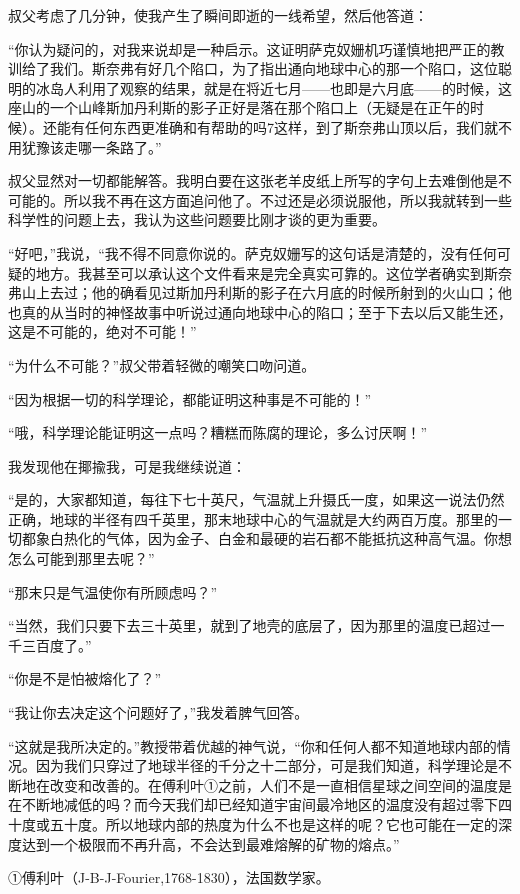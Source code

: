 \documentclass[10pt]{book}
\begin{document}
叔父考虑了几分钟，使我产生了瞬间即逝的一线希望，然后他答道：

“你认为疑问的，对我来说却是一种启示。这证明萨克奴姗机巧谨慎地把严正的教训给了我们。斯奈弗有好几个陷口，为了指出通向地球中心的那一个陷口，这位聪明的冰岛人利用了观察的结果，就是在将近七月——也即是六月底——的时候，这座山的一个山峰斯加丹利斯的影子正好是落在那个陷口上（无疑是在正午的时候）。还能有任何东西更准确和有帮助的吗7这样，到了斯奈弗山顶以后，我们就不用犹豫该走哪一条路了。”

叔父显然对一切都能解答。我明白要在这张老羊皮纸上所写的字句上去难倒他是不可能的。所以我不再在这方面追问他了。不过还是必须说服他，所以我就转到一些科学性的问题上去，我认为这些问题要比刚才谈的更为重要。

“好吧，”我说，“我不得不同意你说的。萨克奴姗写的这句话是清楚的，没有任何可疑的地方。我甚至可以承认这个文件看来是完全真实可靠的。这位学者确实到斯奈弗山上去过；他的确看见过斯加丹利斯的影子在六月底的时候所射到的火山口；他也真的从当时的神怪故事中听说过通向地球中心的陷口；至于下去以后又能生还，这是不可能的，绝对不可能！”

“为什么不可能？”叔父带着轻微的嘲笑口吻问道。

“因为根据一切的科学理论，都能证明这种事是不可能的！”

“哦，科学理论能证明这一点吗？糟糕而陈腐的理论，多么讨厌啊！”

我发现他在揶揄我，可是我继续说道：

“是的，大家都知道，每往下七十英尺，气温就上升摄氏一度，如果这一说法仍然正确，地球的半径有四千英里，那末地球中心的气温就是大约两百万度。那里的一切都象白热化的气体，因为金子、白金和最硬的岩石都不能抵抗这种高气温。你想怎么可能到那里去呢？”

“那末只是气温使你有所顾虑吗？”

“当然，我们只要下去三十英里，就到了地壳的底层了，因为那里的温度已超过一千三百度了。”

“你是不是怕被熔化了？”

“我让你去决定这个问题好了，”我发着脾气回答。

“这就是我所决定的。”教授带着优越的神气说，“你和任何人都不知道地球内部的情况。因为我们只穿过了地球半径的千分之十二部分，可是我们知道，科学理论是不断地在改变和改善的。在傅利叶①之前，人们不是一直相信星球之间空间的温度是在不断地减低的吗？而今天我们却已经知道宇宙间最冷地区的温度没有超过零下四十度或五十度。所以地球内部的热度为什么不也是这样的呢？它也可能在一定的深度达到一个极限而不再升高，不会达到最难熔解的矿物的熔点。”

①傅利叶（J-B-J-Fourier,1768-1830），法国数学家。
\end{document}
